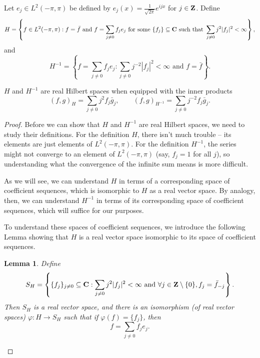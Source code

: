 \documentclass{homework}
\newtheorem{lemma}{Lemma}
\begin{document}
	\question
	\newcommand{\ltwo}{{L^2(-\pi,\pi)}}
	\newcommand{\hm}{{H^{-1}}}
	Let $e_j \in \ltwo$ be defined by $e_j(x) = \frac{1}{\sqrt{2\pi}}e^{ijx}$ for $j \in \textbf{Z}$. Define
	\begin{equation}
		H = \left\{f \in \ltwo : f = \bar{f}\text{ and }f = \sum_{j\ne 0}f_je_j \text{ for some } \{f_j\}\subseteq \C \text{ such that } \sum_{j\ne 0} j^2|f_j|^2 < \infty \right\},
	\end{equation}
	and
	\begin{equation}
		\hm = \left\{f = \sum_{j\ne 0}f_je_j : \sum_{j\ne 0}j^{-2}|f_j |^2 < \infty \text{ and } f = \bar{f}\right\}.
	\end{equation}
	\begin{arabicparts}
		\questionpart
		$H$ and $\hm$ are real Hilbert spaces when equipped with the inner products
		\begin{equation}
			(f,g)_H = \sum_{j\ne 0}j^2f_j\bar{g}_j,\qquad(f,g)_\hm = \sum_{j\ne 0}j^{-2}f_j\bar{g}_j.
		\end{equation}
		
		\begin{proof}
		Before we can show that $H$ and $\hm$ are real Hilbert spaces, we need to study their definitions. For the definition $H$, there isn't much trouble -- its elements are just elements of $\ltwo$. For the definition $H^{-1}$, the series might not converge to an element of $\ltwo$ (say, $f_j = 1$ for all $j$), so understanding what the convergence of the infinite sum means is more difficult. 
		
		As we will see, we can understand $H$ in terms of a corresponding space of coefficient sequences, which is isomorphic to $H$ as a real vector space. By analogy, then, we can understand $H^{-1}$ in terms of its corresponding space of coefficient sequences, which will suffice for our purposes.
		
		To understand these spaces of coefficient sequences, we introduce the following Lemma showing that $H$ is a real vector space isomorphic to its space of coefficient sequences.
		\begin{lemma}
		Define
		\begin{equation}
			S_H = \left\{\{f_j\}_{j \ne 0} \subseteq \textnormal{\bf C} : \sum_{j\ne 0}j^2|f_j|^2 < \infty \textnormal{ and } \forall j \in \textbf{Z} \setminus\{0\}, f_j = \bar{f}_{-j} \right\}.
		\end{equation}
		Then $S_H$ is a real vector space, and there is an isomorphism (of real vector spaces) $\varphi : H \to S_H$ such that if $\varphi(f) = \{f_j\}$, then
		\begin{equation}
			f = \sum_{j\ne 0}f_je_j.
		\end{equation}
		

\end{lemma}
\end{proof}
\end{arabicparts}
\end{document}
